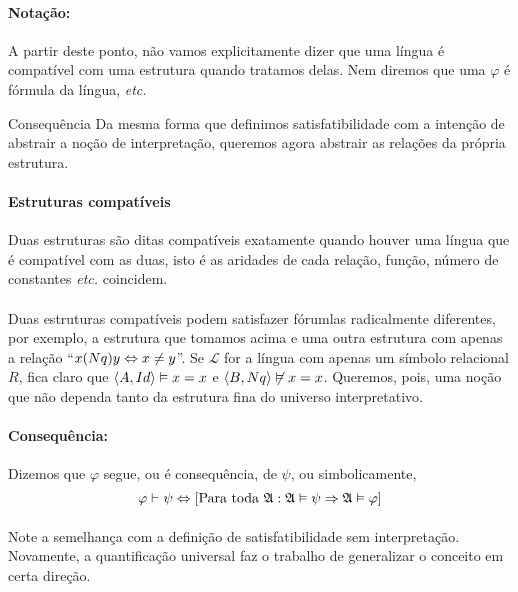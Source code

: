     \paragraph{Notação:}
        A partir deste ponto, não vamos explicitamente dizer que 
        uma língua é compatível com uma estrutura quando tratamos 
        delas. Nem diremos que uma $\varphi$ é fórmula da língua,
        \emph{etc.}

    \begin{definition}{Consequência}
        Da mesma forma que definimos satisfatibilidade com a intenção
        de abstrair a noção de interpretação, queremos agora abstrair
        as relações da própria estrutura.

        \paragraph{Estruturas compatíveis}
            Duas estruturas são ditas compatíveis exatamente quando 
            houver uma língua que é compatível com as duas, isto é 
            as aridades de cada relação, função, número de constantes
            \emph{etc.} coincidem.

        \paragraph{}
            Duas estruturas compatíveis podem satisfazer fórumlas 
            radicalmente diferentes, por exemplo, a estrutura que 
            tomamos acima e uma outra estrutura com apenas a 
            relação ``$x (Nq) y\Leftrightarrow x\not=y$''. Se $\mathcal{L}$ for a língua 
            com apenas um símbolo relacional $R$, fica claro que 
            $\TUPLE{A}{Id}\vDash x = x$ e $\TUPLE{B}{Nq}\not\vDash x = x$.
            Queremos, pois, uma noção que não dependa tanto da estrutura fina
            do universo interpretativo.

        \paragraph{Consequência:}
            Dizemos que $\varphi$ segue, ou é consequência, de $\psi$, ou simbolicamente,
            $$ \varphi\vdash\psi \Leftrightarrow [\text{Para toda }\mathfrak{A}:\mathfrak{A}\vDash\psi\Rightarrow\mathfrak{A}\vDash\varphi]$$
            \paragraph{}
                Note a semelhança com a definição de satisfatibilidade
                sem interpretação. Novamente, a quantificação universal
                faz o trabalho de generalizar o conceito em certa direção.

\end{definition}
